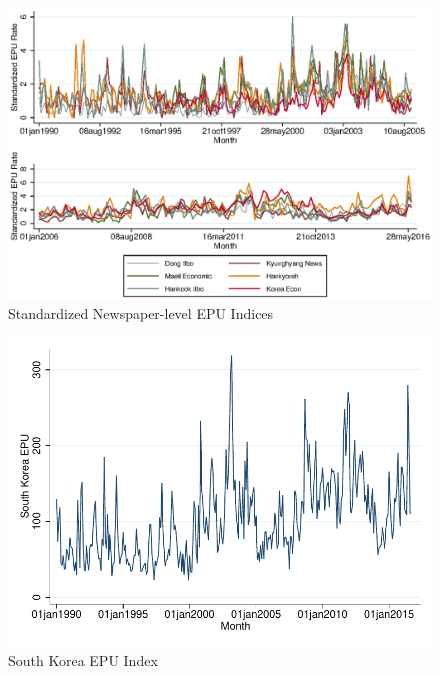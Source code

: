 \begin{landscape}
\begin{figure}[H] \caption{Standardized Newspaper-level EPU Indices} \label{fig:stdepu_ind}
\centering
\includegraphics[scale=1.4]{../output/plots/plot_final_combined.eps}	
\end{figure}


\begin{figure}[H] \caption{South Korea EPU Index} \label{fig:stdepu_final}
\centering
		\includegraphics[scale=1.4]{../output/plots/plot_final_skepu.pdf}
		
\end{figure}


\end{landscape}
